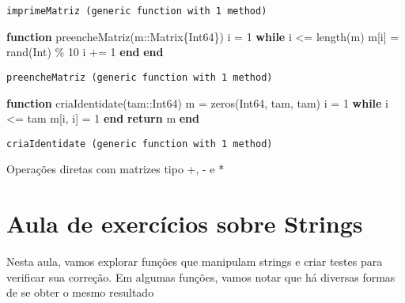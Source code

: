 \documentclass[
  letterpaper,
  DIV=11,
  numbers=noendperiod]{scrreprt}
\newenvironment{Shaded}{\begin{snugshade}}{\end{snugshade}}
\newcommand{\ControlFlowTok}[1]{\textcolor[rgb]{0.00,0.23,0.31}{\textbf{#1}}}
\newcommand{\DataTypeTok}[1]{\textcolor[rgb]{0.68,0.00,0.00}{#1}}
\newcommand{\FloatTok}[1]{\textcolor[rgb]{0.68,0.00,0.00}{#1}}
\newcommand{\FunctionTok}[1]{\textcolor[rgb]{0.28,0.35,0.67}{#1}}
\newcommand{\KeywordTok}[1]{\textcolor[rgb]{0.00,0.23,0.31}{\textbf{#1}}}
\newcommand{\NormalTok}[1]{\textcolor[rgb]{0.00,0.23,0.31}{#1}}
\newcommand{\OperatorTok}[1]{\textcolor[rgb]{0.37,0.37,0.37}{#1}}
\begin{document}
\begin{verbatim}
imprimeMatriz (generic function with 1 method)
\end{verbatim}

\begin{Shaded}
\begin{Highlighting}[]
\KeywordTok{function} \FunctionTok{preencheMatriz}\NormalTok{(m}\OperatorTok{::}\DataTypeTok{Matrix\{Int64\}}\NormalTok{)}
\NormalTok{    i }\OperatorTok{=} \FloatTok{1}
    \ControlFlowTok{while}\NormalTok{ i }\OperatorTok{\textless{}=} \FunctionTok{length}\NormalTok{(m)}
\NormalTok{        m[i] }\OperatorTok{=} \FunctionTok{rand}\NormalTok{(}\DataTypeTok{Int}\NormalTok{) }\OperatorTok{\%} \FloatTok{10}
\NormalTok{        i }\OperatorTok{+=} \FloatTok{1}
    \ControlFlowTok{end}
\KeywordTok{end}
\end{Highlighting}
\end{Shaded}

\begin{verbatim}
preencheMatriz (generic function with 1 method)
\end{verbatim}

\begin{Shaded}
\begin{Highlighting}[]
\KeywordTok{function} \FunctionTok{criaIdentidate}\NormalTok{(tam}\OperatorTok{::}\DataTypeTok{Int64}\NormalTok{)}
\NormalTok{    m }\OperatorTok{=} \FunctionTok{zeros}\NormalTok{(}\DataTypeTok{Int64}\NormalTok{, tam, tam)}
\NormalTok{    i }\OperatorTok{=} \FloatTok{1}
    \ControlFlowTok{while}\NormalTok{ i }\OperatorTok{\textless{}=}\NormalTok{ tam}
\NormalTok{        m[i, i] }\OperatorTok{=} \FloatTok{1}
    \ControlFlowTok{end}
    \ControlFlowTok{return}\NormalTok{ m  }
\KeywordTok{end}
\end{Highlighting}
\end{Shaded}

\begin{verbatim}
criaIdentidate (generic function with 1 method)
\end{verbatim}

Operações diretas com matrizes tipo +, - e *


\chapter{Aula de exercícios sobre
Strings}\label{aula-de-exercuxedcios-sobre-strings}

Nesta aula, vamos explorar funções que manipulam strings e criar testes
para verificar sua correção. Em algumas funções, vamos notar que há
diversas formas de se obter o mesmo resultado
\end{document}

